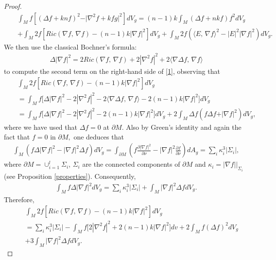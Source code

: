 \documentclass{amsart}
\numberwithin{equation}{section}
\begin{document}
\begin{proof}
		\begin{eqnarray}\label{1}
			&&\int_{M}f\left[\left(\Delta f  + knf\right)^2 - \vert \nabla^2f+kfg\vert^{2}\right]dV_{g} = (n-1)k\int_{M}\left(\Delta f +nkf\right)f^2dV_{g}\nonumber\\
			&&+\int_{M}2f\left[{Ric}(\nabla f,\,\nabla f) - (n-1)k|\nabla f|^{2}\right]dV_{g} + \int_{M}2f\left(\langle E,\,\nabla f\rangle^{2} - |E|^2|\nabla f|^{2}	\right)dV_{g}.
		\end{eqnarray}
We then use the classical Bochner’s formula:
		\begin{eqnarray*}
			\Delta|\nabla f|^2 = 2Ric(\nabla f,\,\nabla f) + 2|\nabla^{2}f|^{2} + 2\langle\nabla\Delta f,\,\nabla f\rangle
		\end{eqnarray*}
		to compute the second term on the right-hand side of \eqref{1}, observing that
		\begin{eqnarray*}
			&&\int_{M}2f\left[{Ric}(\nabla f,\,\nabla f) - (n-1)k|\nabla f|^{2}\right]dV_{g}\nonumber\\
			&& = \int_{M}f\Bigg[\Delta|\nabla f|^2 - 2|\nabla^{2}f|^{2} - 2\langle\nabla\Delta f,\,\nabla f\rangle-  2(n-1)k|\nabla f|^{2}\Bigg]dV_{g}\nonumber\\
			&& = \int_{M}f\Bigg[\Delta|\nabla f|^2 - 2|\nabla^{2}f|^{2} -  2(n-1)k|\nabla f|^{2}\Bigg]dV_{g} + 2\int_{M}\Delta f(f\Delta f + \vert\nabla f\vert^{2}) dV_{g},
		\end{eqnarray*}
		where we have used that $\Delta f=0$ at $\partial M$. Also by Green's identity and again the fact that $f=0$ in $\partial M,$ one deduces that
		\begin{eqnarray*}
			\int_{M}\left(f\Delta|\nabla f|^{2} - |\nabla f|^{2}\Delta f\right)dV_{g} = \int_{\partial M}\left(f\frac{\partial|\nabla f|^2}{\partial\nu} - |\nabla f|^{2}\frac{\partial f}{\partial\nu}\right)dA_{g} = \sum_{i}\kappa_{i}^3\vert\Sigma_{i}\vert,
\end{eqnarray*}
where $\partial M=\displaystyle\cup_{i=1}^{l} \Sigma_{i}$, $\Sigma_{i}$ are the connected components of $\partial M$ and $\kappa_{i}=|\nabla f|\Big|_{\Sigma_{i}}$  (see Proposition \ref{properties}). Consequently,
		\begin{eqnarray*}
			\int_{M}f\Delta|\nabla f|^{2}dV_{g}  = \sum_{i}\kappa_{i}^3\vert\Sigma_{i}\vert + \int_{M}|\nabla f|^{2}\Delta f dV_{g}.
		\end{eqnarray*}
		Therefore, 
		\begin{eqnarray*}
			&&\int_{M}2f\left[{Ric}(\nabla f,\,\nabla f) - (n-1)k|\nabla f|^{2}\right]dV_{g}\nonumber\\
			&& =\sum_{i}\kappa_{i}^3\vert\Sigma_{i}\vert - \int_{M}f\Bigg[ 2|\nabla^{2}f|^{2} +  2(n-1)k|\nabla f|^{2}\Bigg]dv + 2\int_{M}f(\Delta f)^2 dV_{g}\nonumber\\&& + 3\int_{M}|\nabla f|^{2}\Delta fdV_{g}.
		\end{eqnarray*}
		

\end{proof}
\end{document}
